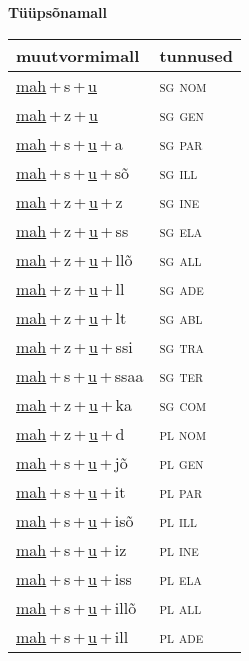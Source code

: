 
\vspace{1.8em}
\begin{minipage}{\textwidth}
\textbf{Tüüpsõnamall \,}\\

\begin{sideways}
\begin{tabular}{l l}
muutvormimall & tunnused \\
\hline
\underline{mah}\,+\,s\,+\,\underline{u} & \textsc{ sg nom } \\
\underline{mah}\,+\,z\,+\,\underline{u} & \textsc{ sg gen } \\
\underline{mah}\,+\,s\,+\,\underline{u}\,+\,a & \textsc{ sg par } \\
\underline{mah}\,+\,s\,+\,\underline{u}\,+\,sõ & \textsc{ sg ill } \\
\underline{mah}\,+\,z\,+\,\underline{u}\,+\,z & \textsc{ sg ine } \\
\underline{mah}\,+\,z\,+\,\underline{u}\,+\,ss & \textsc{ sg ela } \\
\underline{mah}\,+\,z\,+\,\underline{u}\,+\,llõ & \textsc{ sg all } \\
\underline{mah}\,+\,z\,+\,\underline{u}\,+\,ll & \textsc{ sg ade } \\
\underline{mah}\,+\,z\,+\,\underline{u}\,+\,lt & \textsc{ sg abl } \\
\underline{mah}\,+\,z\,+\,\underline{u}\,+\,ssi & \textsc{ sg tra } \\
\underline{mah}\,+\,s\,+\,\underline{u}\,+\,ssaa & \textsc{ sg ter } \\
\underline{mah}\,+\,z\,+\,\underline{u}\,+\,ka & \textsc{ sg com } \\
\underline{mah}\,+\,z\,+\,\underline{u}\,+\,d & \textsc{ pl nom } \\
\underline{mah}\,+\,s\,+\,\underline{u}\,+\,jõ & \textsc{ pl gen } \\
\underline{mah}\,+\,s\,+\,\underline{u}\,+\,it & \textsc{ pl par } \\
\underline{mah}\,+\,s\,+\,\underline{u}\,+\,isõ & \textsc{ pl ill } \\
\underline{mah}\,+\,s\,+\,\underline{u}\,+\,iz & \textsc{ pl ine } \\
\underline{mah}\,+\,s\,+\,\underline{u}\,+\,iss & \textsc{ pl ela } \\
\underline{mah}\,+\,s\,+\,\underline{u}\,+\,illõ & \textsc{ pl all } \\
\underline{mah}\,+\,s\,+\,\underline{u}\,+\,ill & \textsc{ pl ade } \\

\end{tabular}
\end{sideways}
\end{minipage}
